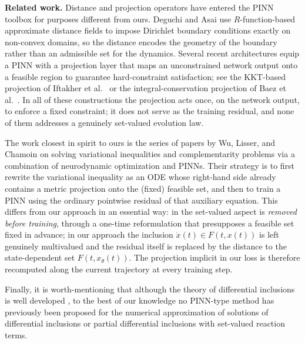 \documentclass[11pt]{elsarticle}
\theoremstyle{definition}
\theoremstyle{remark}
\numberwithin{equation}{section}
\begin{document}
	\noindent\textbf{Related work.} 
	Distance and projection operators have entered the PINN toolbox for
	purposes different from ours.  Deguchi and Asai \cite{deguchi2025} use
	$R$-function-based approximate distance fields to impose Dirichlet
	boundary conditions exactly on non-convex domains, so the distance
	encodes the geometry of the boundary rather than an admissible set for
	the dynamics.  Several recent architectures equip a PINN with a
	projection layer that maps an unconstrained network output onto a
	feasible region to guarantee hard-constraint satisfaction; see the
	KKT-based projection of Iftakher et al.\ \cite{iftakher2025} or the
	integral-conservation projection of Baez et al.\ \cite{baez2025}.  In
	all of these constructions the projection acts once, on the network
	output, to enforce a fixed constraint; it does not serve as the training
	residual, and none of them addresses a genuinely set-valued evolution law.
	
	The work closest in spirit to ours is the series of papers by Wu,
	Lisser, and Chamoin
	\cite{wu2023,wu2024neuropinn,wu2024cmame,wu2025errorbound} on solving
	variational inequalities and complementarity problems via a combination
	of neurodynamic optimization and PINNs.  Their strategy is to first
	rewrite the variational inequality as an ODE whose right-hand side
	already contains a metric projection onto the (fixed) feasible set, and
	then to train a PINN using the ordinary pointwise residual of that
	auxiliary equation.  This differs from our approach in an essential way:
	in \cite{wu2023,wu2024neuropinn,wu2024cmame,wu2025errorbound} the
	set-valued aspect is \emph{removed before training}, through a one-time
	reformulation that presupposes a feasible set fixed in advance; in our
	approach the inclusion $\dot{x}(t)\in F(t,x(t))$ is left genuinely
	multivalued and the residual itself is replaced by the distance to the
	state-dependent set $F(t,x_\theta(t))$.  The projection implicit in our
	loss is therefore recomputed along the current trajectory at every
	training step.
	
Finally, it is worth-mentioning that although the theory of differential inclusions is well developed \cite{aubin_cellina_1984,aubin_frankowska_2009,deimling_1992}, to the best of our knowledge no
	PINN-type method has previously been proposed for the numerical
	approximation of solutions of differential inclusions or partial
	differential inclusions with set-valued reaction terms.
	
\end{document}
